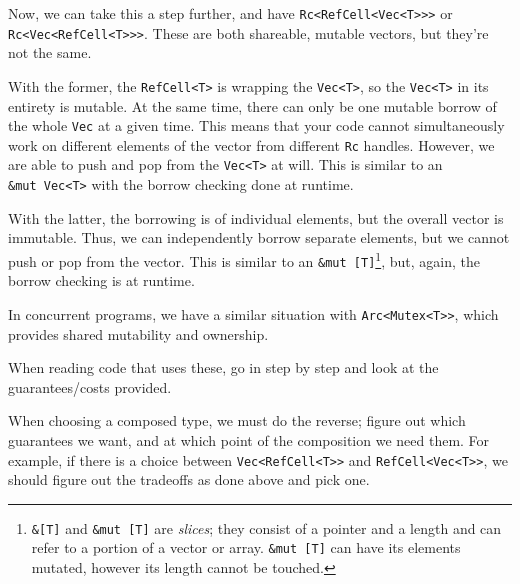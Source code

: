 \documentclass[a4paper,]{book}
\begin{document}
Now, we can take this a step further, and have
\texttt{Rc\textless{}RefCell\textless{}Vec\textless{}T\textgreater{}\textgreater{}\textgreater{}}
or
\texttt{Rc\textless{}Vec\textless{}RefCell\textless{}T\textgreater{}\textgreater{}\textgreater{}}.
These are both shareable, mutable vectors, but they're not the same.

With the former, the \texttt{RefCell\textless{}T\textgreater{}} is
wrapping the \texttt{Vec\textless{}T\textgreater{}}, so the
\texttt{Vec\textless{}T\textgreater{}} in its entirety is mutable. At
the same time, there can only be one mutable borrow of the whole
\texttt{Vec} at a given time. This means that your code cannot
simultaneously work on different elements of the vector from different
\texttt{Rc} handles. However, we are able to push and pop from the
\texttt{Vec\textless{}T\textgreater{}} at will. This is similar to an
\texttt{\&mut\ Vec\textless{}T\textgreater{}} with the borrow checking
done at runtime.

With the latter, the borrowing is of individual elements, but the
overall vector is immutable. Thus, we can independently borrow separate
elements, but we cannot push or pop from the vector. This is similar to
an \texttt{\&mut\ {[}T{]}}\footnote{\texttt{\&{[}T{]}} and
  \texttt{\&mut\ {[}T{]}} are \emph{slices}; they consist of a pointer
  and a length and can refer to a portion of a vector or array.
  \texttt{\&mut\ {[}T{]}} can have its elements mutated, however its
  length cannot be touched.}, but, again, the borrow checking is at
runtime.

In concurrent programs, we have a similar situation with
\texttt{Arc\textless{}Mutex\textless{}T\textgreater{}\textgreater{}},
which provides shared mutability and ownership.

When reading code that uses these, go in step by step and look at the
guarantees/costs provided.

When choosing a composed type, we must do the reverse; figure out which
guarantees we want, and at which point of the composition we need them.
For example, if there is a choice between
\texttt{Vec\textless{}RefCell\textless{}T\textgreater{}\textgreater{}}
and
\texttt{RefCell\textless{}Vec\textless{}T\textgreater{}\textgreater{}},
we should figure out the tradeoffs as done above and pick one.

\end{document}
